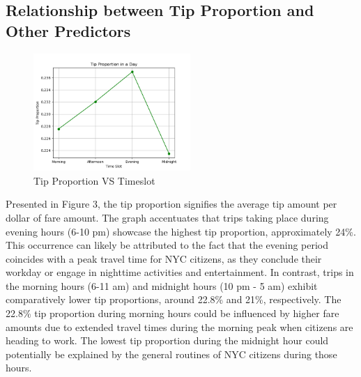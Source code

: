 \documentclass[11pt]{article}
\begin{document}
\subsection{Relationship between Tip Proportion and Other Predictors}
\begin{figure}[h!]
    \includegraphics[width=0.53\textwidth]{plots/Tip_Proportion_WRT_Timeslot.png}
    \centering
    \caption{Tip Proportion VS Timeslot}  
\end{figure} 
Presented in Figure 3, the tip proportion signifies the average tip amount per dollar of fare amount. The graph accentuates that trips taking place during evening hours (6-10 pm) showcase the highest tip proportion, approximately 24\%. This occurrence can likely be attributed to the fact that the evening period coincides with a peak travel time for NYC citizens, as they conclude their workday or engage in nighttime activities and entertainment. In contrast, trips in the morning hours (6-11 am) and midnight hours (10 pm - 5 am) exhibit comparatively lower tip proportions, around 22.8\% and 21\%, respectively. The 22.8\% tip proportion during morning hours could be influenced by higher fare amounts due to extended travel times during the morning peak when citizens are heading to work. The lowest tip proportion during the midnight hour could potentially be explained by the general routines of NYC citizens during those hours.\\
\end{document}
